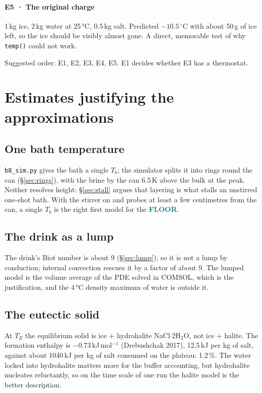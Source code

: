 \documentclass[11pt,a4paper]{article}
\newcommand{\dC}{\,^{\circ}\mathrm{C}}
\newcommand{\code}[1]{\texttt{#1}}
\newcommand{\FLOOR}{\textcolor{teal}{\textsf{\bfseries FLOOR}}}
\begin{document}
\paragraph{E5 · The original charge} 1\,kg ice, 2\,kg water at 25\,°C, 0.5\,kg salt. Predicted
$-10.5\dC$ with about 50\,g of ice left, so the ice should be visibly almost gone. A direct,
memorable test of why \code{temp()} could not work.

Suggested order: E1, E2, E3, E4, E5. E1 decides whether E3 has a thermostat.

\section{Estimates justifying the approximations}
\label{sec:estimates}

\subsection{One bath temperature}
\code{b8\_sim.py} gives the bath a single $T_b$; the simulator splits it into rings round the can
(§\ref{sec:rings}), with the brine by the can 6.5\,K above the bulk at the peak. Neither resolves height:
§\ref{sec:stall} argues that layering is what stalls an unstirred one-shot bath. With the stirrer on and
probes at least a few centimetres from the can, a single $T_b$ is the right first model for the \FLOOR.

\subsection{The drink as a lump}
The drink's Biot number is about 9 (§\ref{sec:lump}), so it is not a lump by conduction; internal
convection rescues it by a factor of about 9. The lumped model is the volume average of the PDE solved
in COMSOL, which is the justification, and the 4\,°C density maximum of water is outside it.

\subsection{The eutectic solid}
At $T_E$ the equilibrium solid is ice + hydrohalite NaCl$\cdot$2H$_2$O, not ice + halite. The
formation enthalpy is $-0.73$\,kJ\,mol$^{-1}$ (Drebushchak 2017), 12.5\,kJ per kg of salt, against
about 1040\,kJ per kg of salt consumed on the plateau: 1.2\,\%. The water locked into hydrohalite
matters more for the buffer accounting, but hydrohalite nucleates reluctantly, so on the time
scale of one run the halite model is the better description.
\end{document}

